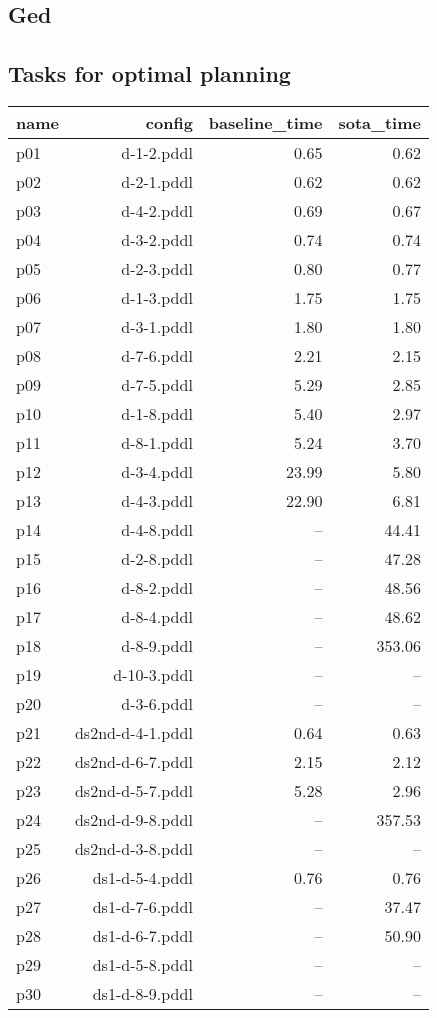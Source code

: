 \documentclass{article}
\begin{document}
                \newpage \subsection{Ged}
                    \subsection*{Tasks for optimal planning}
                    
                            \begin{center}
                            \scriptsize
                            \begin{tabular}{@{}l|r|r|r@{}}
                            name & config & baseline\_time & sota\_time\\\midrule
                              p01& d-1-2.pddl&0.65&0.62\\
  p02& d-2-1.pddl&0.62&0.62\\
  p03& d-4-2.pddl&0.69&0.67\\
  p04& d-3-2.pddl&0.74&0.74\\
  p05& d-2-3.pddl&0.80&0.77\\
  p06& d-1-3.pddl&1.75&1.75\\
  p07& d-3-1.pddl&1.80&1.80\\
  p08& d-7-6.pddl&2.21&2.15\\
  p09& d-7-5.pddl&5.29&2.85\\
  p10& d-1-8.pddl&5.40&2.97\\
  p11& d-8-1.pddl&5.24&3.70\\
  p12& d-3-4.pddl&23.99&5.80\\
  p13& d-4-3.pddl&22.90&6.81\\
  p14& d-4-8.pddl&--&44.41\\
  p15& d-2-8.pddl&--&47.28\\
  p16& d-8-2.pddl&--&48.56\\
  p17& d-8-4.pddl&--&48.62\\
  p18& d-8-9.pddl&--&353.06\\
  p19& d-10-3.pddl&--&--\\
  p20& d-3-6.pddl&--&--\\
  p21& ds2nd-d-4-1.pddl&0.64&0.63\\
  p22& ds2nd-d-6-7.pddl&2.15&2.12\\
  p23& ds2nd-d-5-7.pddl&5.28&2.96\\
  p24& ds2nd-d-9-8.pddl&--&357.53\\
  p25& ds2nd-d-3-8.pddl&--&--\\
  p26& ds1-d-5-4.pddl&0.76&0.76\\
  p27& ds1-d-7-6.pddl&--&37.47\\
  p28& ds1-d-6-7.pddl&--&50.90\\
  p29& ds1-d-5-8.pddl&--&--\\
  p30& ds1-d-8-9.pddl&--&--
                            \end{tabular}
                            \end{center}
                    
\end{document}
